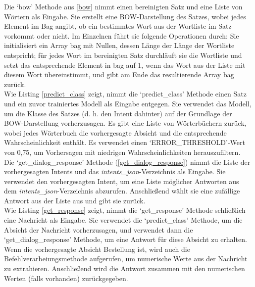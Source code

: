 Die `bow' Methode aus \ref{bow} nimmt einen bereinigten Satz und eine Liste von Wörtern als Eingabe. 
Sie erstellt eine \ac{BOW}-Darstellung des Satzes, wobei jedes Element im Bag angibt, ob ein bestimmtes Wort aus der Wortliste im Satz vorkommt oder nicht. 
Im Einzelnen führt sie folgende Operationen durch: 
Sie initialisiert ein Array bag mit Nullen, dessen Länge der Länge der Wortliste entspricht; für jedes Wort im bereinigten Satz durchläuft sie die Wortliste und setzt das entsprechende Element in bag auf 1, wenn das Wort aus der Liste mit diesem Wort übereinstimmt, und gibt am Ende das resultierende Array bag zurück.\\

Wie Listing \ref{predict_class} zeigt, nimmt die `predict\_class' Methode einen Satz und ein zuvor trainiertes Modell als Eingabe entgegen. 
Sie verwendet das Modell, um die Klasse des Satzes (d. h. den Intent dahinter) auf der Grundlage der \ac{BOW}-Darstellung vorherzusagen. 
Es gibt eine Liste von Wörterbüchern zurück, wobei jedes Wörterbuch die vorhergesagte Absicht und die entsprechende Wahrscheinlichkeit enthält.
Es verwendet einen `ERROR\_THRESHOLD'-Wert von 0,75, um Vorhersagen mit niedrigen Wahrscheinlichkeiten herauszufiltern.\\

Die `get\_dialog\_response' Methode (\ref{get_dialog_response}) nimmt die Liste der vorhergesagten Intents und das \textit{intents\_json}-Verzeichnis als Eingabe. 
Sie verwendet den vorhergesagten Intent, um eine Liste möglicher Antworten aus dem \textit{intents\_json}-Verzeichnis abzurufen. 
Anschließend wählt sie eine zufällige Antwort aus der Liste aus und gibt sie zurück.\\

Wie Listing \ref{get_response} zeigt, nimmt die `get\_response' Methode schließlich eine Nachricht als Eingabe. 
Sie verwendet die `predict\_class' Methode, um die Absicht der Nachricht vorherzusagen, und verwendet dann die `get\_dialog\_response' Methode, um eine Antwort für diese Absicht zu erhalten. 
Wenn die vorhergesagte Absicht \glqq{}Bestellung\grqq{} ist, wird auch die Befehlverarbeiungsmethode aufgerufen, um numerische Werte aus der Nachricht zu extrahieren. 
Anschließend wird die Antwort zusammen mit den numerischen Werten (falls vorhanden) zurückgegeben.
